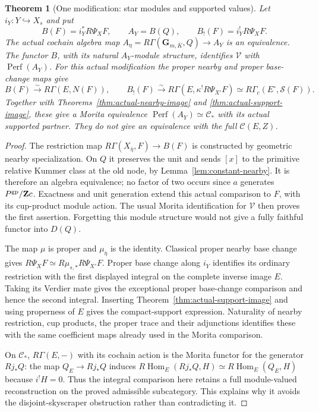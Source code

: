 \documentclass[11pt]{article}
\newtheorem{theorem}{Theorem}[section]
\theoremstyle{definition}
\theoremstyle{remark}
\newcommand{\Perf}{\operatorname{Perf}}
\newcommand{\RHom}{R\operatorname{Hom}}
\begin{document}
\begin{theorem}[One modification: star modules and supported values]
\label{thm:one-modification}
Let $i_Y:Y\hookrightarrow X_s$ and put
\[
 B(F)=i_Y^*R\Psi_XF,\qquad A_Y=B(Q),\qquad
 B_!(F)=i_Y^!R\Psi_XF.
\]
The actual cochain algebra map
$A_\eta=R\Gamma(\mathbf G_{m,\bar K},Q)\to A_Y$ is an equivalence.
The functor $B$, with its natural $A_Y$-module structure, identifies
$\mathcal V$ with $\Perf(A_Y)$.  For this actual modification the
proper nearby and proper base-change maps give
\[
 B(F)\xrightarrow{\sim}R\Gamma(E,N(F)),\qquad
 B_!(F)\xrightarrow{\sim}R\Gamma(E,\kappa^!R\Psi_{X'}F)
                  \simeq R\Gamma_c(E^\circ,\mathcal S(F)).
\]
Together with Theorems~\ref{thm:actual-nearby-image} and
\ref{thm:actual-support-image}, these give a Morita equivalence
$\Perf(A_Y)\simeq\mathcal C_*$ with its actual supported partner.
They do not give an equivalence with the full $\mathcal C(E,Z)$.
\end{theorem}
\begin{proof}
The restriction map $R\Gamma(X_{\bar\eta},F)\to B(F)$ is constructed
by geometric nearby specialization.  On $Q$ it preserves the unit
and sends $[x]$ to the primitive relative Kummer class at the old
node, by Lemma~\ref{lem:constant-nearby}.  It is therefore an
algebra equivalence; no factor of two occurs since $a$ generates
$P^{\rm gp}/\mathbf Zc$.  Exactness and unit generation extend this
actual comparison to $F$, with its cup-product module action.  The
usual Morita identification for $\mathcal V$ then proves the first
assertion.  Forgetting this module structure would not give a fully
faithful functor into $D(Q)$.

The map $\mu$ is proper and $\mu_{\bar\eta}$ is the identity.
Classical proper nearby base change gives
$R\Psi_XF\simeq R\mu_{s,*}R\Psi_{X'}F$.  Proper base change along
$i_Y$ identifies its ordinary restriction with the first displayed
integral on the complete inverse image $E$.  Taking its Verdier mate
gives the exceptional proper base-change comparison and hence the
second integral.  Inserting Theorem~\ref{thm:actual-support-image}
and using properness of $E$ gives the compact-support expression.
Naturality of nearby restriction, cup products, the proper trace and
their adjunctions identifies these with the same coefficient maps
already used in the Morita comparison.

On $\mathcal C_*$, $R\Gamma(E,-)$ with its cochain action is the
Morita functor for the generator $Rj_*Q$: the map
$Q_E\to Rj_*Q$ induces
$\RHom_E(Rj_*Q,H)\simeq\RHom_E(Q_E,H)$ because $i^!H=0$.
Thus the integral comparison here retains a full module-valued
reconstruction on the proved admissible subcategory.  This explains
why it avoids the disjoint-skyscraper obstruction rather than
contradicting it.
\end{proof}
\end{document}
